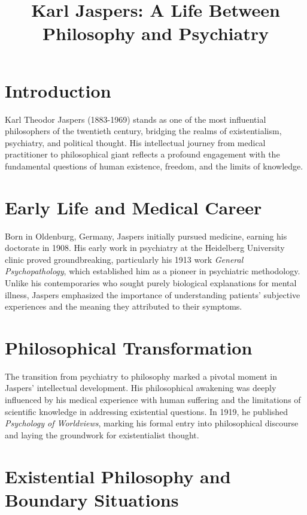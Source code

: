 \documentclass[12pt,a4paper]{article}
\begin{document}
\title{Karl Jaspers: A Life Between Philosophy and Psychiatry}
\author{}
\date{}
\maketitle

\section*{Introduction}

Karl Theodor Jaspers (1883-1969) stands as one of the most influential philosophers of the twentieth century, bridging the realms of existentialism, psychiatry, and political thought. His intellectual journey from medical practitioner to philosophical giant reflects a profound engagement with the fundamental questions of human existence, freedom, and the limits of knowledge.

\section*{Early Life and Medical Career}

Born in Oldenburg, Germany, Jaspers initially pursued medicine, earning his doctorate in 1908. His early work in psychiatry at the Heidelberg University clinic proved groundbreaking, particularly his 1913 work \textit{General Psychopathology}, which established him as a pioneer in psychiatric methodology. Unlike his contemporaries who sought purely biological explanations for mental illness, Jaspers emphasized the importance of understanding patients' subjective experiences and the meaning they attributed to their symptoms.

\section*{Philosophical Transformation}

The transition from psychiatry to philosophy marked a pivotal moment in Jaspers' intellectual development. His philosophical awakening was deeply influenced by his medical experience with human suffering and the limitations of scientific knowledge in addressing existential questions. In 1919, he published \textit{Psychology of Worldviews}, marking his formal entry into philosophical discourse and laying the groundwork for existentialist thought.

\section*{Existential Philosophy and Boundary Situations}
\end{document}
